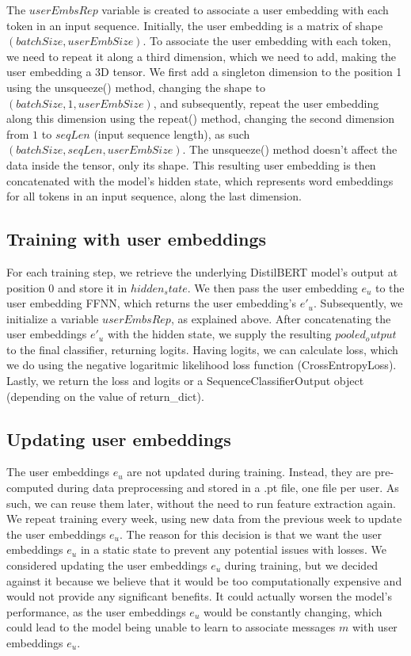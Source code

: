 \documentclass{article}
\begin{document}
The $userEmbsRep$ variable is created to associate a user embedding with each token in an input sequence. Initially, the user embedding is a matrix of shape $(batchSize, userEmbSize)$. To associate the user embedding with each token, we need to repeat it along a third dimension, which we need to add, making the user embedding a 3D tensor. We first add a singleton dimension to the position 1 using the unsqueeze() method, changing the shape to $(batchSize, 1, userEmbSize)$, and subsequently, repeat the user embedding along this dimension using the repeat() method, changing the second dimension from $1$ to $seqLen$ (input sequence length), as such $(batchSize, seqLen, userEmbSize)$. The unsqueeze() method doesn't affect the data inside the tensor, only its shape. This resulting user embedding is then concatenated with the model's hidden state, which represents word embeddings for all tokens in an input sequence, along the last dimension.

\subsection{Training with user embeddings}
For each training step, we retrieve the underlying DistilBERT model's output at position 0 and store it in $hidden_state$. We then pass the user embedding $e_u$ to the user embedding FFNN, which returns the user embedding's $e'_u$. Subsequently, we initialize a variable $userEmbsRep$, as explained above. After concatenating the user embeddings $e'_u$ with the hidden state, we supply the resulting $pooled_output$ to the final classifier, returning logits. Having logits, we can calculate loss, which we do using the negative logaritmic likelihood loss function (CrossEntropyLoss). Lastly, we return the loss and logits or a SequenceClassifierOutput object (depending on the value of return\_dict).\\

\subsection{Updating user embeddings}
The user embeddings $e_u$ are not updated during training. Instead, they are pre-computed during data preprocessing and stored in a .pt file, one file per user. As such, we can reuse them later, without the need to run feature extraction again. We repeat training every week, using new data from the previous week to update the user embeddings $e_u$. The reason for this decision is that we want the user embeddings $e_u$ in a static state to prevent any potential issues with losses. We considered updating the user embeddings $e_u$ during training, but we decided against it because we believe that it would be too computationally expensive and would not provide any significant benefits. It could actually worsen the model's performance, as the user embeddings $e_u$ would be constantly changing, which could lead to the model being unable to learn to associate messages $m$ with user embeddings $e_u$.
\end{document}
